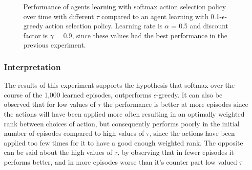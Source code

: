 \documentclass[11pt]{article}
\begin{document}
\begin{center}
\begin{figure}
\caption{Performance of agents learning with softmax action selection policy over time with different $\tau$ compared to an agent learning with 0.1-$\epsilon$-greedy action selection policy. Learning rate is $\alpha$ = 0.5 and discount factor is $\gamma$ = 0.9, since these values had the best performance in the previous experiment.}
\label{Exp3}
\end{figure}
\end{center}
\subsubsection{Interpretation}
The results of this experiment supports the hypothesis that softmax over the course of the 1,000 learned episodes, outperforms $\epsilon$-greedy. It can also be observed that for low values of $\tau$ the performance is better at more episodes since the actions will have been applied more often resulting in an optimally weighted rank between choices of action, but consequently performs poorly in the initial number of episodes compared to high values of $\tau$, since the actions have been applied too few times for it to have a good enough weighted rank. The opposite can be said about the high values of $\tau$, by observing that in fewer episodes it performs better, and in more episodes worse than it's counter part low valued $\tau$
\end{document}
